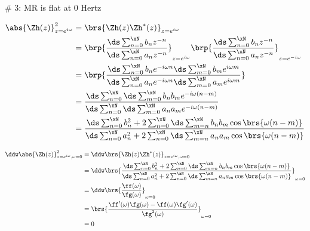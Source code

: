 
\# 3: MR is flat at $0$ Hertz

\begin{align*}
  \abs{\Zh(z)}^2_{z=e^{i\omega}}  
    &= \brs{\Zh(z)\Zh^\ast(z)}_{z=e^{i\omega}}
  \\&= \brp{\frac{\ds\sum_{n=0}^{\xN}b_n z^{-n}}{\ds\sum_{n=0}^{\xN}a_n z^{-n}}}_{z=e^{i\omega}}  
       \brp{\frac{\ds\sum_{n=0}^{\xN}b_n z^{-n}}{\ds\sum_{n=0}^{\xN}a_n z^{-n}}}_{z=e^{-i\omega}}  
  \\&= \brp{\frac{\ds\sum_{n=0}^{\xN}b_n e^{-i\omega n}\ds\sum_{m=0}^{\xN}b_m e^{i\omega m}}
                 {\ds\sum_{n=0}^{\xN}a_n e^{-i\omega n}\ds\sum_{m=0}^{\xN}a_m e^{i\omega m}}}
  \\&=     {\frac{\ds\sum_{n=0}^{\xN}\ds\sum_{m=0}^{\xN} b_n b_m e^{-i\omega(n-m)}}
                 {\ds\sum_{n=0}^{\xN}\ds\sum_{m=0}^{\xN} a_n a_m e^{-i\omega(n-m)}}}
  \\&=     {\frac{\ds\sum_{n=0}^{\xN}b_n^2 + 2\sum_{n=0}^{\xN}\ds\sum_{m=n}^{\xN} b_n b_m \cos\brs{\omega(n-m)}}
                 {\ds\sum_{n=0}^{\xN}a_n^2 + 2\sum_{n=0}^{\xN}\ds\sum_{m=n}^{\xN} a_n a_m \cos\brs{\omega(n-m)}}}
\end{align*}



\begin{align*}
  \ddw\abs{\Zh(z)}^2_{z=e^{i\omega},\omega=0}  
    &= \ddw\brs{\Zh(z)\Zh^\ast(z)}_{z=e^{i\omega},\omega=0}
  \\&= \ddw\brs{\frac{\ds\sum_{n=0}^{\xN}b_n^2 + 2\sum_{n=0}^{\xN}\ds\sum_{m=n}^{\xN} b_n b_m \cos\brs{\omega(n-m)}}
                 {\ds\sum_{n=0}^{\xN}a_n^2 + 2\sum_{n=0}^{\xN}\ds\sum_{m=n}^{\xN} a_n a_m \cos\brs{\omega(n-m)}}}_{\omega=0}
  \\&= \ddw\brs{\frac{\ff(\omega)}{\fg(\omega)}}_{\omega=0}
  \\&= \brs{\frac{\ff'(\omega)\fg(\omega) - \ff(\omega)\fg'(\omega)}{\fg^2(\omega)}}_{\omega=0}
  \\&= 0
\end{align*}


















